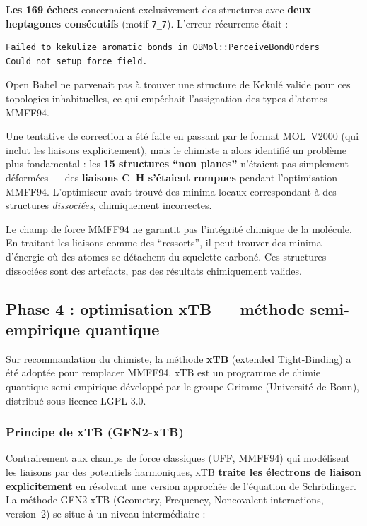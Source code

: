 \documentclass[a4paper,12pt]{article}
\begin{document}
\textbf{Les 169 échecs} concernaient exclusivement des structures avec \textbf{deux heptagones
consécutifs} (motif \texttt{7\_7}). L'erreur récurrente était :

\begin{lstlisting}[language={}, style={}]
Failed to kekulize aromatic bonds in OBMol::PerceiveBondOrders
Could not setup force field.
\end{lstlisting}

Open Babel ne parvenait pas à trouver une structure de Kekulé valide pour ces topologies
inhabituelles, ce qui empêchait l'assignation des types d'atomes MMFF94.

Une tentative de correction a été faite en passant par le format MOL~V2000 (qui inclut les
liaisons explicitement), mais le chimiste a alors identifié un problème plus fondamental :
les \textbf{15 structures ``non planes''} n'étaient pas simplement déformées — des
\textbf{liaisons C--H s'étaient rompues} pendant l'optimisation MMFF94. L'optimiseur avait
trouvé des minima locaux correspondant à des structures \textit{dissociées}, chimiquement
incorrectes.

\begin{attention}
  Le champ de force MMFF94 ne garantit pas l'intégrité chimique de la molécule. En traitant
  les liaisons comme des ``ressorts'', il peut trouver des minima d'énergie où des atomes se
  détachent du squelette carboné. Ces structures dissociées sont des artefacts, pas des
  résultats chimiquement valides.
\end{attention}

\subsection{Phase 4 : optimisation xTB — méthode semi-empirique quantique}

Sur recommandation du chimiste, la méthode \textbf{xTB} (extended Tight-Binding) a été adoptée
pour remplacer MMFF94. xTB est un programme de chimie quantique semi-empirique développé par le
groupe Grimme (Université de Bonn), distribué sous licence LGPL-3.0.

\subsubsection{Principe de xTB (GFN2-xTB)}

Contrairement aux champs de force classiques (UFF, MMFF94) qui modélisent les liaisons par des
potentiels harmoniques, xTB \textbf{traite les électrons de liaison explicitement} en résolvant
une version approchée de l'équation de Schrödinger. La méthode GFN2-xTB (Geometry, Frequency,
Noncovalent interactions, version~2) se situe à un niveau intermédiaire :
\end{document}
